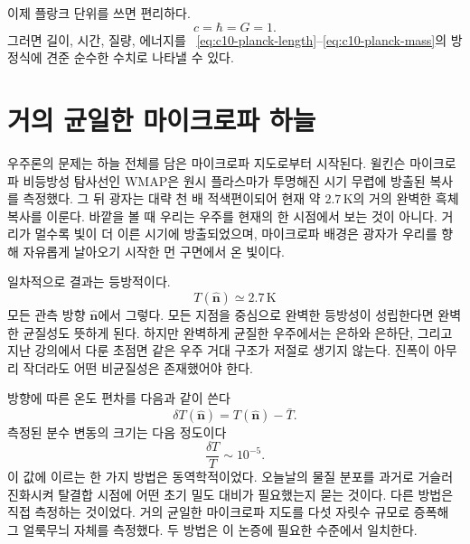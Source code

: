 이제 플랑크 단위를 쓰면 편리하다.
\begin{equation}
c=\hbar=G=1.
\label{eq:c10-planck-units}
\end{equation}
그러면 길이, 시간, 질량, 에너지를 ~\eqref{eq:c10-planck-length}--\eqref{eq:c10-planck-mass}의 방정식에 견준 순수한 수치로 나타낼 수 있다.

\section{거의 균일한 마이크로파 하늘}

우주론의 문제는 하늘 전체를 담은 마이크로파 지도로부터 시작된다. 윌킨슨 마이크로파 비등방성 탐사선인 WMAP은 원시 플라스마가 투명해진 시기 무렵에 방출된 복사를 측정했다. 그 뒤 광자는 대략 천 배 적색편이되어 현재 약 \(2.7\,\mathrm K\)의 거의 완벽한 흑체 복사를 이룬다. 바깥을 볼 때 우리는 우주를 현재의 한 시점에서 보는 것이 아니다. 거리가 멀수록 빛이 더 이른 시기에 방출되었으며, 마이크로파 배경은 광자가 우리를 향해 자유롭게 날아오기 시작한 먼 구면에서 온 빛이다.

\begin{classroomqa}
\end{classroomqa}

일차적으로 결과는 등방적이다.
\[
T(\hat{\mathbf n})\simeq 2.7\,\mathrm K
\]
모든 관측 방향 \(\hat{\mathbf n}\)에서 그렇다. 모든 지점을 중심으로 완벽한 등방성이 성립한다면 완벽한 균질성도 뜻하게 된다. 하지만 완벽하게 균질한 우주에서는 은하와 은하단, 그리고 지난 강의에서 다룬 초점면 같은 우주 거대 구조가 저절로 생기지 않는다. 진폭이 아무리 작더라도 어떤 비균질성은 존재했어야 한다.

방향에 따른 온도 편차를 다음과 같이 쓴다
\[
\delta T(\hat{\mathbf n})=T(\hat{\mathbf n})-\bar T.
\]
측정된 분수 변동의 크기는 다음 정도이다
\begin{equation}
\frac{\delta T}{T}\sim10^{-5}.
\label{eq:c10-cmb-anisotropy}
\end{equation}
이 값에 이르는 한 가지 방법은 동역학적이었다. 오늘날의 물질 분포를 과거로 거슬러 진화시켜 탈결합 시점에 어떤 초기 밀도 대비가 필요했는지 묻는 것이다. 다른 방법은 직접 측정하는 것이었다. 거의 균일한 마이크로파 지도를 다섯 자릿수 규모로 증폭해 그 얼룩무늬 자체를 측정했다. 두 방법은 이 논증에 필요한 수준에서 일치한다.

